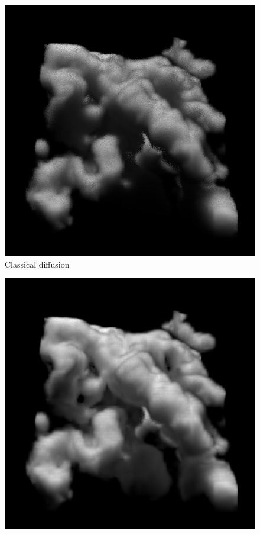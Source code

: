 \teaser
{
\centering
\begin{subfigure}{0.24\linewidth}
\includegraphics[width=\linewidth]{images/nebulae_ms_cda.png}
\vspace{-0.17in}
\caption{Classical diffusion}
\label{fig:teaser_cda}
\end{subfigure}%
\hspace{0.002\linewidth}
\begin{subfigure}{0.24\linewidth}
\includegraphics[width=\linewidth]{images/nebulae_ms_p5.png}

\end{subfigure}}
